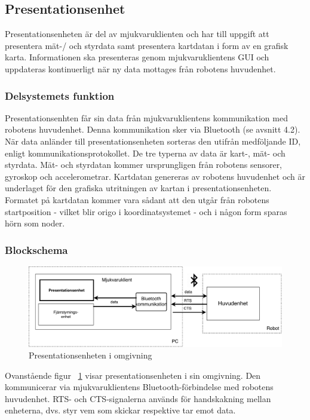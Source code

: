 \documentclass{article}
\begin{document}
\subsection{Presentationsenhet}
Presentationsenheten är del av mjukvaruklienten och har till uppgift att presentera mät-/ och styrdata samt presentera kartdatan i form av en grafisk karta. Informationen ska presenteras genom mjukvaruklientens GUI och uppdateras kontinuerligt när ny data mottages från robotens huvudenhet. 

\subsubsection{Delsystemets funktion}
Presentationsenhten får sin data från mjukvaruklientens kommunikation med robotens huvudenhet. Denna kommunikation sker via Bluetooth (se avsnitt 4.2). När data anländer till presentationsenheten sorteras den utifrån medföljande ID, enligt kommunikationsprotokollet. De tre typerna av data är kart-, mät- och styrdata. Mät- och styrdatan kommer ursprungligen från robotens sensorer, gyroskop och accelerometrar. Kartdatan genereras av robotens huvudenhet och är underlaget för den grafiska utritningen av kartan i presentationsenheten. Formatet på kartdatan kommer vara sådant att den utgår från robotens startposition - vilket blir origo i koordinatsystemet - och i någon form sparas hörn som noder. 

\subsubsection{Blockschema}
\begin{figure}[H]

\includegraphics[scale=0.37]{Oversikt_presentationsenhet3}
\caption{Presentationsenheten i omgivning}
\label{fig:Oversikt_presentationsenhet3}
\end{figure}
Ovanstående figur ~\ref{fig:Oversikt_presentationsenhet3} visar presentationsenheten i sin omgivning. Den kommunicerar via mjukvaruklientens Bluetooth-förbindelse med robotens huvudenhet. RTS- och CTS-signalerna används för handskakning mellan enheterna, dvs. styr vem som skickar respektive tar emot data.  
\end{document}
